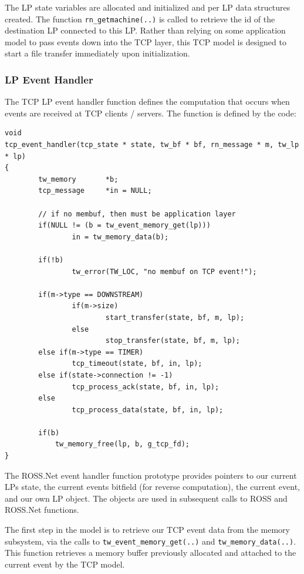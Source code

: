 \documentclass[conference,onecolumn]{IEEEtran}
\begin{document}
The LP state variables are allocated and initialized and per LP data structures created.  The function {\tt rn\_getmachine(..)} is called to retrieve the id of the destination LP connected to this LP.  Rather than relying on some application model to pass events down into the TCP layer, this TCP model is designed to start a file transfer immediately upon initialization.

\subsubsection{LP Event Handler}

The TCP LP event handler function defines the computation that occurs when events are received at TCP clients / servers.  The function is defined by the code:

\begin{small}\begin{verbatim}
void
tcp_event_handler(tcp_state * state, tw_bf * bf, rn_message * m, tw_lp * lp)
{
        tw_memory       *b;
        tcp_message     *in = NULL;

        // if no membuf, then must be application layer
        if(NULL != (b = tw_event_memory_get(lp)))
                in = tw_memory_data(b);

        if(!b)
                tw_error(TW_LOC, "no membuf on TCP event!");

        if(m->type == DOWNSTREAM)
                if(m->size)
                        start_transfer(state, bf, m, lp);
                else
                        stop_transfer(state, bf, m, lp);
        else if(m->type == TIMER)
                tcp_timeout(state, bf, in, lp);
        else if(state->connection != -1)
                tcp_process_ack(state, bf, in, lp);
        else
                tcp_process_data(state, bf, in, lp);

        if(b)
            tw_memory_free(lp, b, g_tcp_fd);
}
\end{verbatim}\end{small}

The ROSS.Net event handler function prototype provides pointers to our current LPs state, the current events bitfield (for reverse computation), the current event, and our own LP object.  The objects are used in subsequent calls to ROSS and ROSS.Net functions.

The first step in the model is to retrieve our TCP event data from the memory subsystem, via the calls to {\tt tw\_event\_memory\_get(..)} and {\tt tw\_memory\_data(..)}.  This function retrieves a memory buffer previously allocated and attached to the current event by the TCP model.
\end{document}
